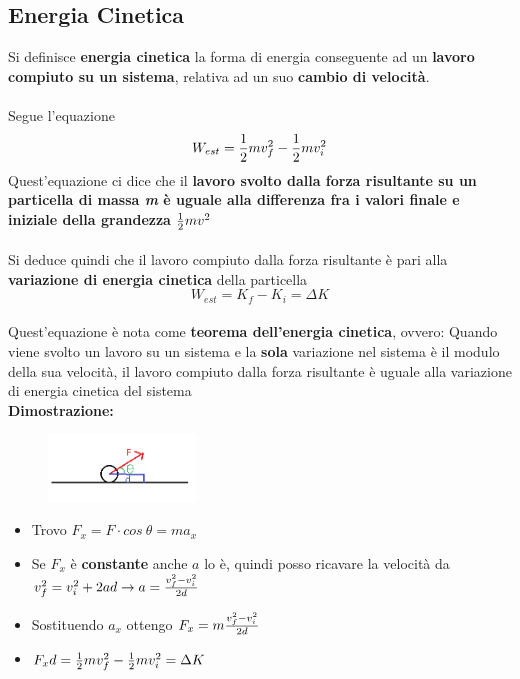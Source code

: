 \documentclass[12pt]{article}
\begin{document}
\subsection{Energia Cinetica}
    Si definisce \textbf{energia cinetica} la forma di energia conseguente ad un \textbf{lavoro compiuto su un sistema}, relativa ad un suo \textbf{cambio di velocità}.
    \paragraph{} Segue l'equazione
    $$W_{est} = {1 \over 2}mv_f^2 - {1 \over 2}mv_i^2$$
    Quest'equazione ci dice che il \textbf{lavoro svolto dalla forza risultante su un particella di massa \textit{m} è uguale alla differenza fra i valori finale e iniziale della grandezza ${1 \over 2}mv^2$}

    \paragraph{} Si deduce quindi che il lavoro compiuto dalla forza risultante è pari alla \textbf{variazione di energia cinetica} della particella
    $$W_{est} = K_f - K_i = \Delta K$$

    \paragraph{} Quest'equazione è nota come \textbf{teorema dell'energia cinetica}, ovvero:
    Quando viene svolto un lavoro su un sistema e la \textbf{sola} variazione nel sistema è il modulo della sua velocità, il lavoro compiuto dalla forza risultante è uguale alla variazione di energia cinetica del sistema\\[12pt]
    \textbf{Dimostrazione:} 
    \begin{figure}[!htb]
        \centering
        \includegraphics[width=0.35\textwidth]{Lavoro.png}
    \end{figure}
    \begin{itemize}
        \item Trovo $F_x = F \cdot cos \ \theta = ma_x$
        \item Se $F_x$ è \textbf{constante} anche $a$ lo è, quindi posso ricavare la velocità da ${v_f^2 = v_i^2 + 2ad} \rightarrow {a = {{v_f^2-v_i^2} \over 2d}}$
        \item Sostituendo $a_x$ ottengo $F_x = m{{v_f^2-v_i^2}\over 2d}$
        \item $F_xd = {1 \over 2}mv_f^2 - {1 \over 2}mv_i^2 = \Delta K$
    \end{itemize}
    \newpage
\end{document}

